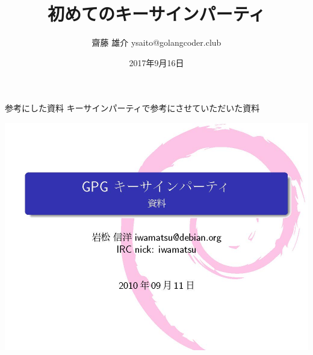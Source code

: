 \title{初めてのキーサインパーティ}
\author{齋藤 雄介  ysaito@golangcoder.club}
\date{2017年9月16日}



\begin{frame}
\titlepage{}
\end{frame}

\begin{frame}{参考にした資料}
  キーサインパーティで参考にさせていただいた資料

  \includegraphics[width=0.8\hsize]{image201709/shiryo001.jpg}
  \end{frame}


\section{}

